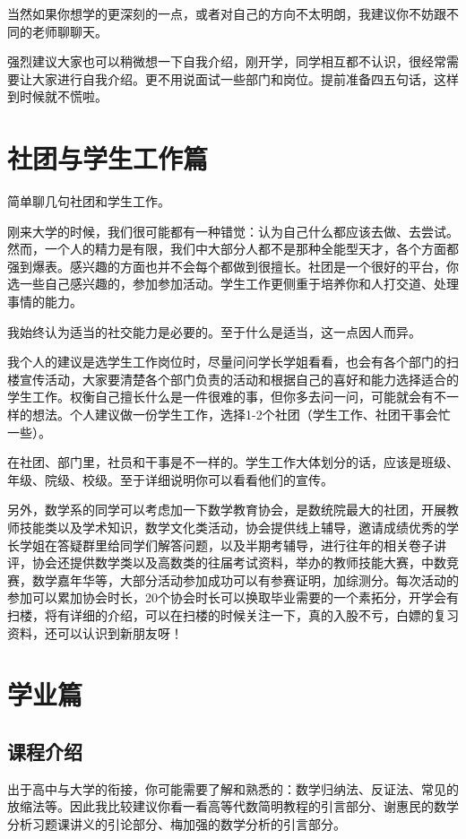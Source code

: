 \documentclass{my_paper}
\begin{document}
当然如果你想学的更深刻的一点，或者对自己的方向不太明朗，我建议你不妨跟不同的老师聊聊天。

强烈建议大家也可以稍微想一下\textcolor[rgb]{1,0,0}{自我介绍}，刚开学，同学相互都不认识，很经常需要让大家进行自我介绍。更不用说面试一些部门和岗位。提前准备四五句话，这样到时候就不慌啦。

\section{社团与学生工作篇}
简单聊几句社团和学生工作。

刚来大学的时候，我们很可能都有一种错觉：认为自己什么都应该去做、去尝试。然而，一个人的精力是有限，我们中大部分人都不是那种全能型天才，各个方面都强到爆表。感兴趣的方面也并不会每个都做到很擅长。社团是一个很好的平台，你选一些自己感兴趣的，参加参加活动。学生工作更侧重于培养你和人打交道、处理事情的能力。

我始终认为适当的社交能力是必要的。至于什么是\textcolor[rgb]{1,0,0}{适当}，这一点因人而异。

我个人的建议是选学生工作岗位时，\colorbox{-blue}{尽量问问学长学姐看看}，也会有各个部门的扫楼宣传活动，\colorbox{-blue}{大家要清楚各个部门负责的活动和根据自己的喜好和能力选择适合的学生工作。}权衡自己擅长什么是一件很难的事，但你多去问一问，可能就会有不一样的想法。个人建议做一份学生工作，选择1-2个社团（学生工作、社团干事会忙一些）。

在社团、部门里，社员和干事是不一样的。学生工作大体划分的话，应该是班级、年级、院级、校级。至于详细说明你可以看看他们的宣传。
   
另外，数学系的同学可以考虑加一下数学教育协会，是数统院最大的社团，开展教师技能类以及学术知识，数学文化类活动，协会提供线上辅导，邀请成绩优秀的学长学姐在答疑群里给同学们解答问题，以及半期考辅导，进行往年的相关卷子讲评，协会还提供数学类以及高数类的往届考试资料，举办的教师技能大赛，中数竞赛，数学嘉年华等，大部分活动参加成功可以有参赛证明，加综测分。每次活动的参加可以累加协会时长，20个协会时长可以换取毕业需要的一个素拓分，开学会有扫楼，将有详细的介绍，可以在扫楼的时候关注一下，真的入股不亏，白嫖的复习资料，还可以认识到新朋友呀！

\section{学业篇}

\subsection{课程介绍}
出于高中与大学的衔接，你可能需要了解和熟悉的：数学归纳法、反证法、常见的放缩法等。因此我比较建议你看一看高等代数简明教程的\textcolor[rgb]{1,0,0}{引言}部分、谢惠民的数学分析习题课讲义的引论部分、梅加强的数学分析的引言部分。
\end{document}
